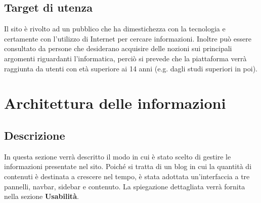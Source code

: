 \documentclass[12pt]{article}
\begin{document}
	\subsection{Target di utenza}
		Il sito è rivolto ad un pubblico che ha dimestichezza con la tecnologia e certamente con l'utilizzo di Internet per cercare informazioni. Inoltre può essere consultato da persone che desiderano acquisire delle nozioni sui principali argomenti riguardanti l'informatica, perciò si prevede che la piattaforma verrà raggiunta da utenti con età superiore ai 14 anni (e.g. dagli studi superiori in poi).
		
	\section{Architettura delle informazioni}
	\subsection{Descrizione}
		In questa sezione verrà descritto il modo in cui è stato scelto di gestire le informazioni presentate nel sito. Poiché si tratta di un blog in cui la quantità di contenuti è destinata a crescere nel tempo, è stata adottata un'interfaccia a tre pannelli, navbar, sidebar e contenuto. La spiegazione dettagliata verrà fornita nella sezione \textbf{Usabilità}.
\end{document}
